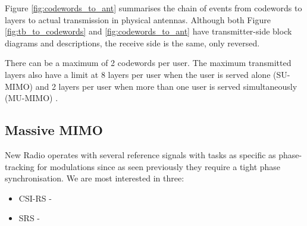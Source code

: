Figure \ref{fig:codewords_to_ant} summarises the chain of events from codewords to layers to actual transmission in physical antennas. Although both Figure \ref{fig:tb_to_codewords} and \ref{fig:codewords_to_ant} have transmitter-side block diagrams and descriptions, the receive side is the same, only reversed.



There can be a maximum of 2 codewords per user. The maximum transmitted layers also have a limit at 8 layers per user when the user is served alone (SU-MIMO) and 2 layers per user when more than one user is served simultaneously (MU-MIMO) \cite{3gpp-codebooks}.



\subsection*{Massive MIMO}

New Radio operates with several reference signals with tasks as specific as phase-tracking for modulations since as seen previously they require a tight phase synchronisation. We are most interested in three: %

\begin{itemize} %
    \item \ac{CSI-RS} - %
    \item \ac{SRS} - 
\end{itemize}



